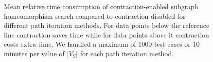\begin{figure}
\begin{subfigure} {0.5\linewidth}

\end{subfigure}

\caption{Mean relative time consumption of contraction-enabled subgraph homeomorphism search compared to contraction-disabled for different path iteration methods. For data points below the reference line contraction saves time while for data points above it contraction costs extra time. We handled a maximum of 1000 test cases or 10 minutes per value of $|V_S|$ for each path iteration method.}	
\label{fig:contraction-performance}
\end{figure}
